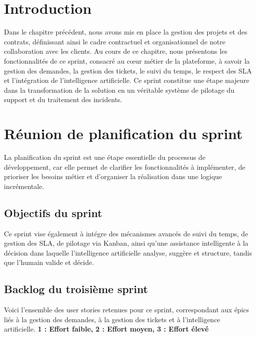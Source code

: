 ﻿\section*{Introduction}
Dans le chapitre précédent, nous avons mis en place la gestion des projets et
des contrats, définissant ainsi le cadre contractuel et organisationnel de
notre collaboration avec les clients.
\newline Au cours de ce chapitre, nous présentons les fonctionnalités de ce
sprint, consacré au cœur métier de la plateforme, à savoir la gestion des
demandes, la gestion des tickets, le suivi du temps, le respect des SLA et
l'intégration de l'intelligence artificielle. Ce sprint constitue une étape
majeure dans la transformation de la solution en un véritable système de
pilotage du support et du traitement des incidents.

\section{Réunion de planification du sprint}
\label{sec:planning_sprint3}
La planification du sprint est une étape essentielle du processus de développement, car elle permet de clarifier les fonctionnalités à implémenter, de prioriser les besoins métier et d’organiser la réalisation dans une logique incrémentale.
\subsection{Objectifs du sprint}
Ce sprint vise également à intégre des mécanismes avancés de suivi 
du temps, de gestion des SLA, de pilotage via Kanban, ainsi qu'une 
assistance intelligente à la décision dans laquelle l'intelligence 
artificielle analyse, suggère et structure, tandis que l'humain 
valide et décide.
\subsection{Backlog du troisième sprint}
\label{sec:backlog_sprint3}

Voici l’ensemble des user stories retenues pour ce sprint, correspondant aux épics liés à la gestion des demandes, à la gestion des tickets et à l’intelligence artificielle.
\newline
	\textbf{1 : Effort faible, 2 : Effort moyen, 3 : Effort élevé}


